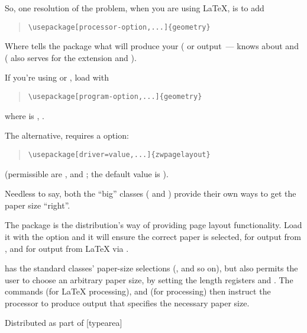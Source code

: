So, one resolution of the problem, when you are using \LaTeX{}, is to add
\begin{quote}
\begin{verbatim}
\usepackage[processor-option,...]{geometry}
\end{verbatim}
\end{quote}
Where  tells the package what will produce
your (\PS{} or  output~---  knows about
 and  ( also
serves for the extension  and
).

If you're using \PDFLaTeX{} or \xetex{}, load with
\begin{quote}
\begin{verbatim}
\usepackage[program-option,...]{geometry}
\end{verbatim}
\end{quote}
where  is ,
.

The alternative,  requires a 
option:
\begin{quote}
\begin{verbatim}
\usepackage[driver=value,...]{zwpagelayout}
\end{verbatim}
\end{quote}
(permissible  are , 
and ; the default value is ).

Needless to say, both the ``big'' classes ( and
) provide their own ways to get the paper size
``right''.

The  package is the 
distribution's way of providing page layout functionality.  Load it
with the  option and it will ensure the correct
paper is selected, for  output from \PDFLaTeX{}, and for
\PS{} output from \LaTeX{} via .

 has the standard classes' paper-size selections
(,  and so on), but also
permits the user to choose an arbitrary paper size, by setting the
length registers  and .  The commands
 (for \LaTeX{} processing), and 
(for \PDFLaTeX{} processing) then instruct the processor to produce
output that specifies the necessary paper size.
\begin{ctanrefs}
\item[geometry.sty]
\item[memoir.cls]
\item[typearea.sty]Distributed as part of [typearea]
\item[zwpagelayout.sty]
\end{ctanrefs}

